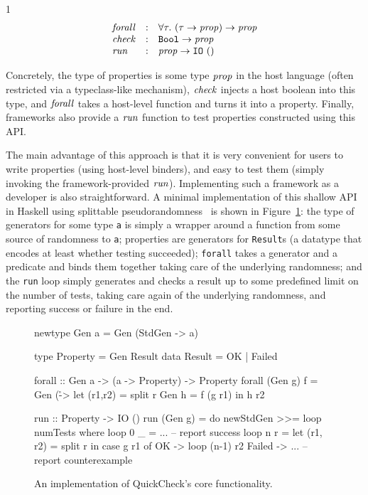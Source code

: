 \begin{spacing}{1}
  \[
    \begin{array}{lcl}
      \mathit{forall} & : & \forall \tau. ~ (\tau \rightarrow \mathit{prop}) \rightarrow \mathit{prop} \\
      \mathit{check}  & : & \mathtt{Bool} \rightarrow \mathit{prop}                                \\
      \mathit{run}    & : & \mathit{prop} \rightarrow \mathtt{IO}~()
    \end{array}
  \]
\end{spacing}
\vspace{0.5\baselineskip}
Concretely, the type of properties is some type $\mathit{prop}$ in the host language (often
restricted via a typeclass-like mechanism), $\mathit{check}$ injects a host boolean into this
type, and $\mathit{forall}$ takes a host-level function and turns it into a property. Finally,
frameworks also provide a $\mathit{run}$ function to test properties constructed using this
API.

The main advantage of this approach is that it is very convenient for users to write
properties (using host-level binders), and easy to test them (simply invoking the
framework-provided $\mathit{run}$).
%
Implementing such a framework as a developer is also straightforward. A minimal
implementation of this shallow API in Haskell using splittable
pseudorandomness~\cite{ClaessenP13} is shown in Figure~\ref{fig:core-qc-impl}: the type
of generators for some type \texttt{a} is simply a wrapper around a function from some
source of randomness to \texttt{a}; properties are generators for \texttt{Result}s (a
datatype that encodes at least whether testing succeeded); \texttt{forall} takes a
generator and a predicate and binds them together taking care of the underlying
randomness; and the \texttt{run} loop simply generates and checks a result up to some
predefined limit on the number of tests, taking care again of the underlying
randomness, and reporting success or failure in the end.

\begin{figure}[t]
  \begin{code}[language=Haskell]
newtype Gen a = Gen (StdGen -> a)

type Property = Gen Result
data Result = OK | Failed

forall :: Gen a -> (a -> Property) -> Property
forall (Gen g) f = Gen (\r -> let (r1,r2) = split r
                                      Gen h = f (g r1)
                                  in h r2

run :: Property -> IO ()
run (Gen g) = do newStdGen >>= loop numTests
  where loop 0 _ = ... -- report success
        loop n r = let (r1, r2) = split r in case g r1 of
          OK     -> loop (n-1) r2
          Failed -> ... -- report counterexample
\end{code}
  \caption{An implementation of QuickCheck's core functionality.}
  \label{fig:core-qc-impl}
\end{figure}

